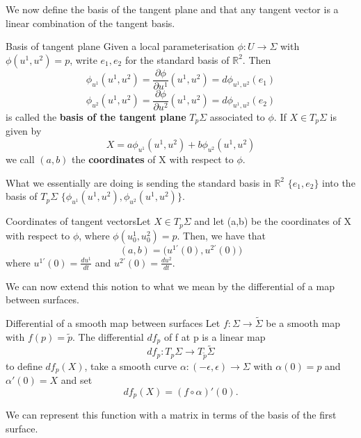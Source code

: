 \documentclass[twoside]{article}
\begin{document}
We now define the basis of the tangent plane and that any tangent vector is a linear combination of the tangent basis.

\begin{definition_exam}{Basis of tangent plane}{} Given a local parameterisation $\phi: U \rightarrow \Sigma$ with $\phi(u^1, u^2) = p$, write $e_1, e_2$ for the standard basis of $\mathbb{R}^2.$ Then 
$$
\phi_{u^{1}}(u^1, u^2) = \frac{\partial \phi}{\partial u^1}(u^1, u^2) = d\phi_{u^{1}, u^{2}}(e_1)
$$
$$
\phi_{u^{2}}(u^1, u^2) = \frac{\partial \phi}{\partial u^2}(u^1, u^2) = d\phi_{u^{1}, u^{2}}(e_2)
$$
is called the \textbf{basis of the tangent plane} $T_p\Sigma$ associated to $\phi$. If $X \in T_p\Sigma$ is given by 
$$
X = a\phi_{u^{1}}(u^1, u^2) + b\phi_{u^{2}}(u^1,u^2)
$$
we call $(a,b)$ the \textbf{coordinates} of X with respect to $\phi$.
\end{definition_exam}

What we essentially are doing is sending the standard basis in $\mathbb{R}^2$ $\{e_1,e_2\}$ into the basis of $T_p\Sigma$ $\{\phi_{u^{1}}(u^1,u^2),\phi_{u^{2}}(u^1,u^2)\}.$

\begin{proposition_exam}{Coordinates of tangent vectors}{}Let $X \in T_p\Sigma$ and let (a,b) be the coordinates of X with respect to $\phi$, where $\phi(u_0^1,u_0^2) = p.$ Then, we have that 
$$
(a,b) = \bigg(u^{1'}(0), u^{2'}(0)\bigg)
$$
where $u^{1'}(0) = \frac{du^1}{dt}$ and $u^{2'}(0) = \frac{du^2}{dt}$.
\end{proposition_exam}


We can now extend this notion to what we mean by the differential of a map between surfaces.
\begin{definition_exam}{Differential of a smooth map between surfaces}{} Let $f: \Sigma \rightarrow \tilde{\Sigma}$ be a smooth map with $f(p) = \tilde{p}$. The differential $df_p$ of f at p is a linear map 
$$
df_p: T_p\Sigma \rightarrow T_{\tilde{p}}\tilde{\Sigma}
$$
to define $df_p(X)$, take a smooth curve $\alpha: (-\epsilon, \epsilon) \rightarrow \Sigma$ with $\alpha(0) = p$ and $\alpha'(0) = X$ and set 
$$
df_p(X) = (f \circ \alpha)'(0).
$$
\end{definition_exam}

We can represent this function with a matrix in terms of the basis of the first surface.
\end{document}

